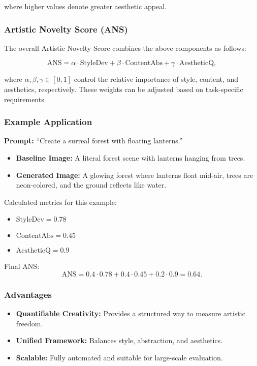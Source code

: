 where higher values denote greater aesthetic appeal.

\subsubsection{Artistic Novelty Score (ANS)}
The overall Artistic Novelty Score combines the above components as follows:

\begin{equation}
\text{ANS} = \alpha \cdot \text{StyleDev} + \beta \cdot \text{ContentAbs} + \gamma \cdot \text{AestheticQ},
\end{equation}

where \(\alpha, \beta, \gamma \in [0,1]\) control the relative importance of style, content, and aesthetics, respectively. These weights can be adjusted based on task-specific requirements.

\subsubsection{Example Application}
\textbf{Prompt:} ``Create a surreal forest with floating lanterns.''

\begin{itemize}
    \item \textbf{Baseline Image:} A literal forest scene with lanterns hanging from trees.
    \item \textbf{Generated Image:} A glowing forest where lanterns float mid-air, trees are neon-colored, and the ground reflects like water.
\end{itemize}

Calculated metrics for this example:
\begin{itemize}
    \item \(\text{StyleDev} = 0.78\)
    \item \(\text{ContentAbs} = 0.45\)
    \item \(\text{AestheticQ} = 0.9\)
\end{itemize}

\noindent Final ANS:
\begin{equation}
\text{ANS} = 0.4 \cdot 0.78 + 0.4 \cdot 0.45 + 0.2 \cdot 0.9 = 0.64.
\end{equation}

\subsubsection{Advantages}
\begin{itemize}
    \item \textbf{Quantifiable Creativity:} Provides a structured way to measure artistic freedom.
    \item \textbf{Unified Framework:} Balances style, abstraction, and aesthetics.
    \item \textbf{Scalable:} Fully automated and suitable for large-scale evaluation.
\end{itemize}

